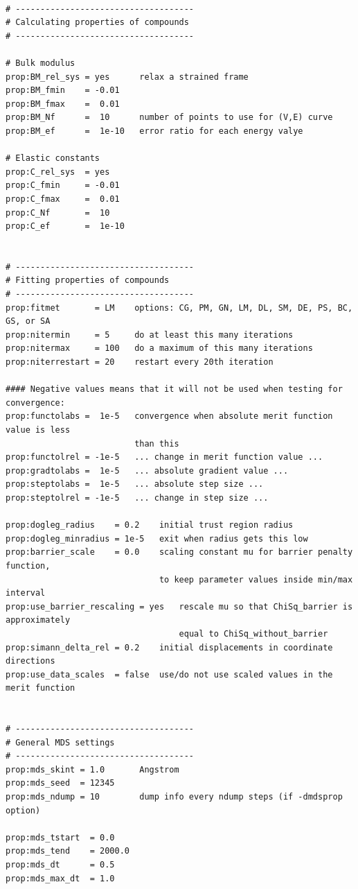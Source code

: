 \documentclass[a4paper,12pt,pdftex,onecolumn]{article}
\begin{document}
\begin{Verbatim}[fontsize=\relsize{-1},frame=single]

# ------------------------------------
# Calculating properties of compounds
# ------------------------------------

# Bulk modulus
prop:BM_rel_sys = yes      relax a strained frame
prop:BM_fmin    = -0.01
prop:BM_fmax    =  0.01
prop:BM_Nf      =  10      number of points to use for (V,E) curve
prop:BM_ef      =  1e-10   error ratio for each energy valye

# Elastic constants
prop:C_rel_sys  = yes
prop:C_fmin     = -0.01
prop:C_fmax     =  0.01
prop:C_Nf       =  10
prop:C_ef       =  1e-10


# ------------------------------------
# Fitting properties of compounds
# ------------------------------------
prop:fitmet       = LM    options: CG, PM, GN, LM, DL, SM, DE, PS, BC, GS, or SA
prop:nitermin     = 5     do at least this many iterations
prop:nitermax     = 100   do a maximum of this many iterations
prop:niterrestart = 20    restart every 20th iteration

#### Negative values means that it will not be used when testing for convergence:
prop:functolabs =  1e-5   convergence when absolute merit function value is less
                          than this
prop:functolrel = -1e-5   ... change in merit function value ...
prop:gradtolabs =  1e-5   ... absolute gradient value ...
prop:steptolabs =  1e-5   ... absolute step size ...
prop:steptolrel = -1e-5   ... change in step size ...

prop:dogleg_radius    = 0.2    initial trust region radius
prop:dogleg_minradius = 1e-5   exit when radius gets this low
prop:barrier_scale    = 0.0    scaling constant mu for barrier penalty function,
                               to keep parameter values inside min/max interval
prop:use_barrier_rescaling = yes   rescale mu so that ChiSq_barrier is approximately
                                   equal to ChiSq_without_barrier
prop:simann_delta_rel = 0.2    initial displacements in coordinate directions
prop:use_data_scales  = false  use/do not use scaled values in the merit function


# ------------------------------------
# General MDS settings
# ------------------------------------
prop:mds_skint = 1.0       Angstrom
prop:mds_seed  = 12345
prop:mds_ndump = 10        dump info every ndump steps (if -dmdsprop option)

prop:mds_tstart  = 0.0
prop:mds_tend    = 2000.0
prop:mds_dt      = 0.5
prop:mds_max_dt  = 1.0


\end{Verbatim}
\end{document}
